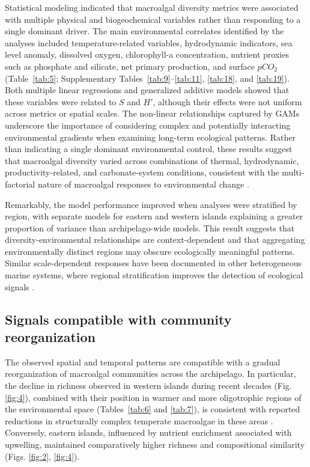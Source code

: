 \documentclass[a4paper,fleqn]{cas-sc}
\begin{document}
Statistical modeling indicated that macroalgal diversity metrics were associated with multiple physical and biogeochemical variables rather than responding to a single dominant driver. The main environmental correlates identified by the analyses included temperature-related variables, hydrodynamic indicators, sea level anomaly, dissolved oxygen, chlorophyll-a concentration, nutrient proxies such as phosphate and silicate, net primary production, and surface $pCO_{2}$ (Table~\ref{tab:5}; Supplementary Tables~\ref{tab:9}--\ref{tab:11}, \ref{tab:18}, and \ref{tab:19}). Both multiple linear regressions and generalized additive models showed that these variables were related to $S$ and $H'$, although their effects were not uniform across metrics or spatial scales. The non-linear relationships captured by GAMs underscore the importance of considering complex and potentially interacting environmental gradients when examining long-term ecological patterns. Rather than indicating a single dominant environmental control, these results suggest that macroalgal diversity varied across combinations of thermal, hydrodynamic, productivity-related, and carbonate-system conditions, consistent with the multi-factorial nature of macroalgal responses to environmental change \citep{RILOV2020105045, JI202191, Noissetteetal2022}.

Remarkably, the model performance improved when analyses were stratified by region, with separate models for eastern and western islands explaining a greater proportion of variance than archipelago-wide models. This result suggests that diversity-environmental relationships are context-dependent and that aggregating environmentally distinct regions may obscure ecologically meaningful patterns. Similar scale-dependent responses have been documented in other heterogeneous marine systems, where regional stratification improves the detection of ecological signals \citep{Drexle2013, Caselle2020}.

\subsection{Signals compatible with community reorganization}

The observed spatial and temporal patterns are compatible with a gradual reorganization of macroalgal communities across the archipelago. In particular, the decline in richness observed in western islands during recent decades (Fig.\ref{fig:4}), combined with their position in warmer and more oligotrophic regions of the environmental space (Tables~\ref{tab:6} and \ref{tab:7}), is consistent with reported reductions in structurally complex temperate macroalgae in these areas \citep{RIERA2015, Valdazoetal2017}. Conversely, eastern islands, influenced by nutrient enrichment associated with upwelling, maintained comparatively higher richness and compositional similarity (Figs. \ref{fig:2}, \ref{fig:4}).
\end{document}
